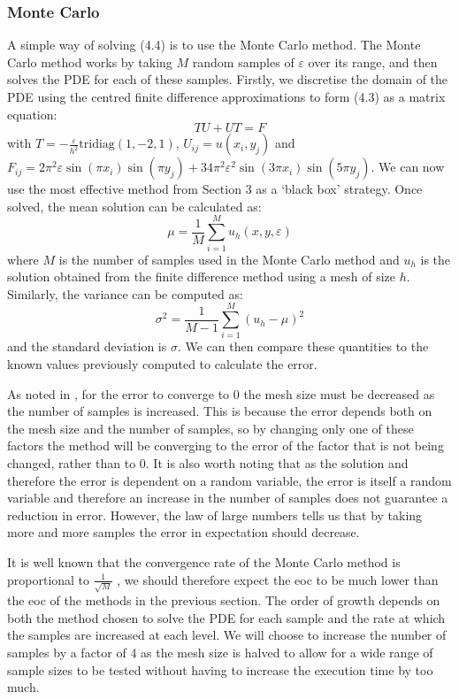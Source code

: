 \documentclass[11pt]{article}
\numberwithin{equation}{section}
\begin{document}
\subsubsection{Monte Carlo}
A simple way of solving (4.4) is to use the Monte Carlo method. The Monte Carlo method works by taking $M$ random samples of $\varepsilon$ over its range, and then solves the PDE for each of these samples. Firstly, we discretise the domain of the PDE using the centred finite difference approximations to form (4.3) as a matrix equation:
\begin{equation}
TU + UT = F
\end{equation}
with $T = -\frac{\varepsilon}{h^2} \text{tridiag}(1,-2,1)$, $U_{ij} = u(x_i, y_j)$ and $F_{ij} = 2\pi^2 \varepsilon \sin(\pi x_i) \sin(\pi y_j)+ 34 \pi^2 \varepsilon^2 \sin(3 \pi x_i) \sin(5 \pi y_j)$. We can now use the most effective method from Section 3 as a `black box' strategy. Once solved, the mean solution can be calculated as:
\begin{equation}
\mu = \frac{1}{M} \sum_{i=1}^M u_h (x, y, \varepsilon)
\end{equation}
where $M$ is the number of samples used in the Monte Carlo method and $u_h$ is the solution obtained from the finite difference method using a mesh of size $h$. Similarly, the variance can be computed as:
\begin{equation}
\sigma^2 = \frac{1}{M-1}\sum_{i=1}^M (u_h - \mu)^2
\end{equation}
and the standard deviation is $\sigma$. We can then compare these quantities to the known values previously computed to calculate the error.

As noted in \cite{Bishop}, for the error to converge to 0 the mesh size must be decreased as the number of samples is increased. This is because the error depends both on the mesh size and the number of samples, so by changing only one of these factors the method will be converging to the error of the factor that is not being changed, rather than to 0. It is also worth noting that as the solution and therefore the error is dependent on a random variable, the error is itself a random variable and therefore an increase in the number of samples does not guarantee a reduction in error. However, the law of large numbers tells us that by taking more and more samples the error in expectation should decrease.

It is well known that the convergence rate of the Monte Carlo method is proportional to $\frac{1}{\sqrt{M}}$ \cite{Kalos}, we should therefore expect the eoc to be much lower than the eoc of the methods in the previous section. The order of growth depends on both the method chosen to solve the PDE for each sample and the rate at which the samples are increased at each level. We will choose to increase the number of samples by a factor of 4 as the mesh size is halved to allow for a wide range of sample sizes to be tested without having to increase the execution time by too much.
\end{document}
